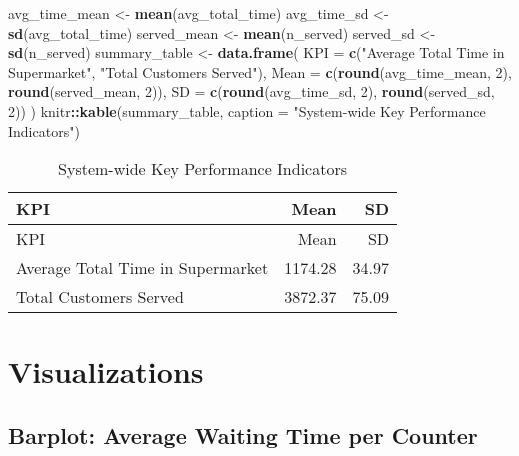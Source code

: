 \documentclass[
]{article}
\newenvironment{Shaded}{\begin{snugshade}}{\end{snugshade}}
\newcommand{\AttributeTok}[1]{\textcolor[rgb]{0.13,0.29,0.53}{#1}}
\newcommand{\DecValTok}[1]{\textcolor[rgb]{0.00,0.00,0.81}{#1}}
\newcommand{\FunctionTok}[1]{\textcolor[rgb]{0.13,0.29,0.53}{\textbf{#1}}}
\newcommand{\NormalTok}[1]{#1}
\newcommand{\OtherTok}[1]{\textcolor[rgb]{0.56,0.35,0.01}{#1}}
\newcommand{\SpecialCharTok}[1]{\textcolor[rgb]{0.81,0.36,0.00}{\textbf{#1}}}
\newcommand{\StringTok}[1]{\textcolor[rgb]{0.31,0.60,0.02}{#1}}
\begin{document}
\begin{Shaded}
\begin{Highlighting}[]
\NormalTok{avg\_time\_mean }\OtherTok{\textless{}{-}} \FunctionTok{mean}\NormalTok{(avg\_total\_time)}
\NormalTok{avg\_time\_sd }\OtherTok{\textless{}{-}} \FunctionTok{sd}\NormalTok{(avg\_total\_time)}
\NormalTok{served\_mean }\OtherTok{\textless{}{-}} \FunctionTok{mean}\NormalTok{(n\_served)}
\NormalTok{served\_sd }\OtherTok{\textless{}{-}} \FunctionTok{sd}\NormalTok{(n\_served)}
\NormalTok{summary\_table }\OtherTok{\textless{}{-}} \FunctionTok{data.frame}\NormalTok{(}
\AttributeTok{KPI =} \FunctionTok{c}\NormalTok{(}\StringTok{"Average Total Time in Supermarket"}\NormalTok{, }\StringTok{"Total Customers Served"}\NormalTok{),}
\AttributeTok{Mean =} \FunctionTok{c}\NormalTok{(}\FunctionTok{round}\NormalTok{(avg\_time\_mean, }\DecValTok{2}\NormalTok{), }\FunctionTok{round}\NormalTok{(served\_mean, }\DecValTok{2}\NormalTok{)),}
\AttributeTok{SD =} \FunctionTok{c}\NormalTok{(}\FunctionTok{round}\NormalTok{(avg\_time\_sd, }\DecValTok{2}\NormalTok{), }\FunctionTok{round}\NormalTok{(served\_sd, }\DecValTok{2}\NormalTok{))}
\NormalTok{)}
\NormalTok{knitr}\SpecialCharTok{::}\FunctionTok{kable}\NormalTok{(summary\_table, }\AttributeTok{caption =} \StringTok{"System{-}wide Key Performance Indicators"}\NormalTok{)}
\end{Highlighting}
\end{Shaded}

\begin{longtable}[]{@{}lrr@{}}
\caption{System-wide Key Performance Indicators}\tabularnewline
\toprule\noalign{}
KPI & Mean & SD \\
\midrule\noalign{}
\endfirsthead
\toprule\noalign{}
KPI & Mean & SD \\
\midrule\noalign{}
\endhead
\bottomrule\noalign{}
\endlastfoot
Average Total Time in Supermarket & 1174.28 & 34.97 \\
Total Customers Served & 3872.37 & 75.09 \\
\end{longtable}

\newpage
\centering

\section{Visualizations}\label{visualizations}

\justifying

\subsection{Barplot: Average Waiting Time per
Counter}\label{barplot-average-waiting-time-per-counter}
\end{document}
